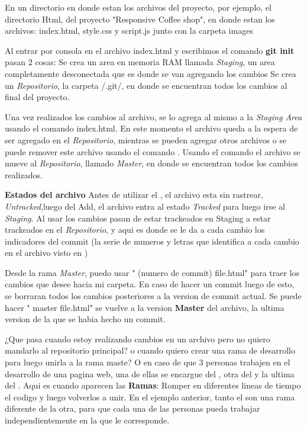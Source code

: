 En un directorio en donde estan los archivos del proyecto, por ejemplo, el directorio Html, del proyecto "Responsive Coffee shop", en donde estan los archivos: index.html, style.css y script.js junto con la carpeta images

Al entrar por consola en el archivo index.html y escribimos el comando \textbf{git init} pasan 2 cosas:
  Se crea un area en memoria RAM llamada \textit{Staging}, un area completamente desconectada que es donde se van agregando los cambios
  Se crea un \textit{Repositorio}, la carpeta /.git/, en donde se encuentran todos los cambios al final del proyecto.

Una vez realizados los cambios al archivo, se lo agrega al mismo a la \textit{Staging Area} usando el comando  index.html. En este momento el archivo queda a la espera de ser agregado en el \textit{Repositorio}, mientras se pueden agregar otros archivos o se puede remover este archivo usando el comando .
Usando el comando  el archivo se mueve al \textit{Repositorio}, llamado \textit{Master}, en donde se encuentran todos los cambios realizados.

\textbf{Estados del archivo}
Antes de utilizar el , el archivo esta sin rastrear, \textit{Untracked},luego del Add, el archivo entra al estado \textit{Tracked} para luego irse al \textit{Staging}. Al usar  los cambios pasan de estar trackeados en Staging a estar trackeados en el \textit{Repositorio}, y aqui es donde se le da a cada cambio los indicadores del commit (la serie de numeros y letras que identifica a cada cambio en el archivo visto en )

Desde la rama \textit{Master}, puedo usar " (numero de commit) file.html" para traer los cambios que desee hacia mi carpeta.
En caso de hacer un commit luego de esto, se borraran todos los cambios posteriores a la version de commit actual.
Se puede hacer " master file.html" se vuelve a la version \textbf{Master} del archivo, la ultima version de la que se habia hecho un commit.


¿Que pasa cuando estoy realizando cambios en un archivo pero no quiero mandarlo al repositorio principal? o cuando quiero crear una rama de desarrollo para luego unirla a la rama maste? O en caso de que 3 personas trabajen en el desarrollo de una pagina web, una de ellas se encargue del , otra del  y la ultima del .
Aqui es cuando aparecen las \textbf{Ramas}: Romper en diferentes lineas de tiempo el codigo y luego volverlos a unir. En el ejemplo anterior, tanto el  son una rama diferente de la otra, para que cada una de las personas pueda trabajar independientemente en la que le corresponde.


